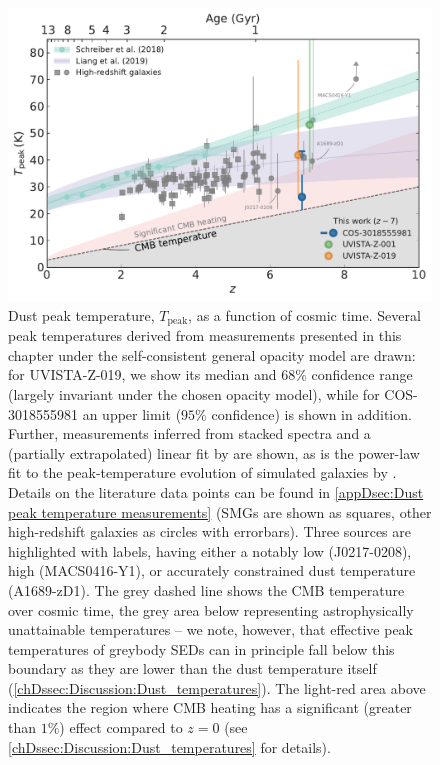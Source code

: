\begin{figure}[t]
    \centering
    \includegraphics[width=0.8\linewidth]{"Plots/ChapterD/Redshift_T_peak"}
    \caption[Dust peak temperature as a function of redshift.]{Dust peak temperature, $T_\text{peak}$, as a function of cosmic time. Several peak temperatures derived from measurements presented in this chapter under the self-consistent general opacity model are drawn: for UVISTA-Z-019, we show its median and $68\%$ confidence range (largely invariant under the chosen opacity model), while for COS-3018555981 an upper limit ($95\%$ confidence) is shown in addition. Further, measurements inferred from stacked spectra and a (partially extrapolated) linear fit by \citet{2018A&A...609A..30S} are shown, as is the power-law fit to the peak-temperature evolution of simulated galaxies by \citet{2019MNRAS.489.1397L}. Details on the literature data points can be found in \cref{appDsec:Dust peak temperature measurements} (SMGs are shown as squares, other high-redshift galaxies as circles with errorbars). Three sources are highlighted with labels, having either a notably low (J0217-0208), high (MACS0416-Y1), or accurately constrained dust temperature (A1689-zD1). The grey dashed line shows the CMB temperature over cosmic time, the grey area below representing astrophysically unattainable temperatures -- we note, however, that effective peak temperatures of greybody SEDs can in principle fall below this boundary as they are lower than the dust temperature itself (\cref{chDssec:Discussion:Dust_temperatures}). The light-red area above indicates the region where CMB heating has a significant (greater than $1\%$) effect compared to $z=0$ (see \cref{chDssec:Discussion:Dust_temperatures} for details).
    }
    \label{chDfig:T_peak_evolution}
\end{figure}


